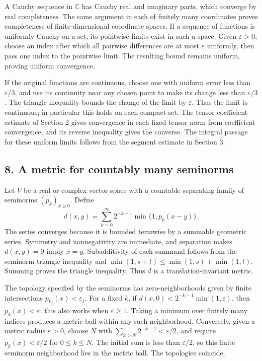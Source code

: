 \documentclass[
  11pt,
]{article}
\begin{document}
A Cauchy sequence in \(\mathbb C\) has Cauchy real and imaginary parts,
which converge by real completeness. The same argument in each of
finitely many coordinates proves completeness of finite-dimensional
coordinate spaces. If a sequence of functions is uniformly Cauchy on a
set, its pointwise limits exist in such a space. Given
\(\varepsilon>0\), choose an index after which all pairwise differences
are at most \(\varepsilon\) uniformly, then pass one index to the
pointwise limit. The resulting bound remains uniform, proving uniform
convergence.

If the original functions are continuous, choose one with uniform error
less than \(\varepsilon/3\), and use its continuity near any chosen
point to make its change less than \(\varepsilon/3\). The triangle
inequality bounds the change of the limit by \(\varepsilon\). Thus the
limit is continuous; in particular this holds on each compact set. The
tensor coefficient estimate of Section 2 gives convergence in each fixed
tensor norm from coefficient convergence, and its reverse inequality
gives the converse. The integral passage for these uniform limits
follows from the segment estimate in Section 3.

\subsection{8. A metric for countably many
seminorms}\label{a-metric-for-countably-many-seminorms}

Let \(V\) be a real or complex vector space with a countable separating
family of seminorms \((p_k)_{k\geq0}\). Define \[
d(x,y)=\sum_{k=0}^\infty 2^{-k-1}\min\{1,p_k(x-y)\}.
\] The series converges because it is bounded termwise by a summable
geometric series. Symmetry and nonnegativity are immediate, and
separation makes \(d(x,y)=0\) imply \(x=y\). Subadditivity of each
summand follows from the seminorm triangle inequality and
\(\min(1,s+t)\leq\min(1,s)+\min(1,t)\). Summing proves the triangle
inequality. Thus \(d\) is a translation-invariant metric.

The topology specified by the seminorms has zero-neighborhoods given by
finite intersections \(p_{k_j}(x)<\varepsilon_j\). For a fixed \(k\), if
\(d(x,0)<2^{-k-1}\min(1,\varepsilon)\), then \(p_k(x)<\varepsilon\);
this also works when \(\varepsilon\geq1\). Taking a minimum over
finitely many indices produces a metric ball within any such
neighborhood. Conversely, given a metric radius \(\varepsilon>0\),
choose \(N\) with \(\sum_{k>N}2^{-k-1}<\varepsilon/2\), and require
\(p_k(x)<\varepsilon/2\) for \(0\leq k\leq N\). The initial sum is less
than \(\varepsilon/2\), so this finite seminorm neighborhood lies in the
metric ball. The topologies coincide.
\end{document}

